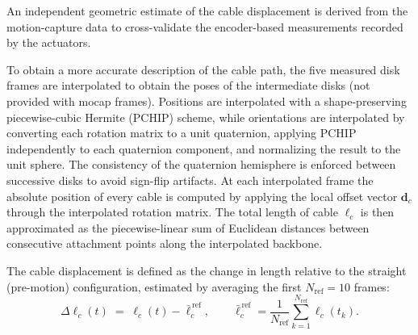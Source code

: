 \documentclass[14pt, a4paper]{article}
\begin{document}
An independent geometric estimate of the cable displacement is derived from the motion-capture data to cross-validate the encoder-based measurements recorded by the actuators.

To obtain a more accurate description of the cable path, the five measured disk frames are interpolated to obtain the poses of the intermediate disks (not provided with mocap frames).
Positions are interpolated with a shape-preserving piecewise-cubic Hermite (PCHIP) scheme, while orientations are interpolated by converting each rotation matrix to a unit quaternion, applying PCHIP independently to each quaternion component, and normalizing the result to the unit sphere.
The consistency of the quaternion hemisphere is enforced between successive disks to avoid sign-flip artifacts.
At each interpolated frame the absolute position of every cable is computed by applying the local offset vector $\mathbf{d}_c$ through the interpolated rotation matrix.
The total length of cable $\ell_c$ is then approximated as the piecewise-linear sum of Euclidean distances between consecutive attachment points along the interpolated backbone.

The cable displacement is defined as the change in length relative to the straight (pre-motion) configuration, estimated by averaging the first $N_{\mathrm{ref}} = 10$ frames:
\begin{equation}
    \Delta \ell_c(t) \;=\; \ell_c(t) - \bar{\ell}_c^{\,\mathrm{ref}},
    \qquad
    \bar{\ell}_c^{\,\mathrm{ref}} = \frac{1}{N_{\mathrm{ref}}}
    \sum_{k=1}^{N_{\mathrm{ref}}} \ell_c(t_k).
\end{equation}
\end{document}
